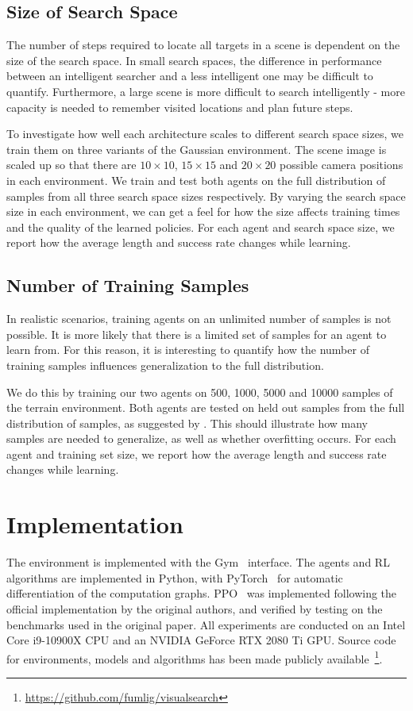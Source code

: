 \subsection{Size of Search Space}

The number of steps required to locate all targets in a scene is dependent on the size of the search space.
In small search spaces, the difference in performance between an intelligent searcher and a less intelligent one may be difficult to quantify.
Furthermore, a large scene is more difficult to search intelligently - more capacity is needed to remember visited locations and plan future steps.

To investigate how well each architecture scales to different search space sizes, we train them on three variants of the Gaussian environment.
The scene image is scaled up so that there are \(10 \times 10\), \(15 \times 15\) and \(20 \times 20\) possible camera positions in each environment.
We train and test both agents on the full distribution of samples from all three search space sizes respectively.
By varying the search space size in each environment, we can get a feel for how the size affects training times and the quality of the learned policies.
For each agent and search space size, we report how the average length and success rate changes while learning.

\subsection{Number of Training Samples}

In realistic scenarios, training agents on an unlimited number of samples is not possible.
It is more likely that there is a limited set of samples for an agent to learn from.
For this reason, it is interesting to quantify how the number of training samples influences generalization to the full distribution.

We do this by training our two agents on 500, 1000, 5000 and 10000 samples of the terrain environment.
Both agents are tested on held out samples from the full distribution of samples, as suggested by \cite{cobbe_leveraging_2020}.
This should illustrate how many samples are needed to generalize, as well as whether overfitting occurs.
For each agent and training set size, we report how the average length and success rate changes while learning.

\section{Implementation}

The environment is implemented with the Gym~\cite{brockman_openai_2016} interface.
The agents and RL algorithms are implemented in Python, with PyTorch~\cite{paszke_pytorch_2019} for automatic differentiation of the computation graphs.
PPO~\cite{schulman_proximal_2017} was implemented following the official implementation by the original authors,
and verified by testing on the benchmarks used in the original paper.
All experiments are conducted on an Intel Core i9-10900X CPU and an NVIDIA GeForce RTX 2080 Ti GPU.
Source code for environments, models and algorithms has been made publicly available~\footnote{\url{https://github.com/fumlig/visualsearch}}.
